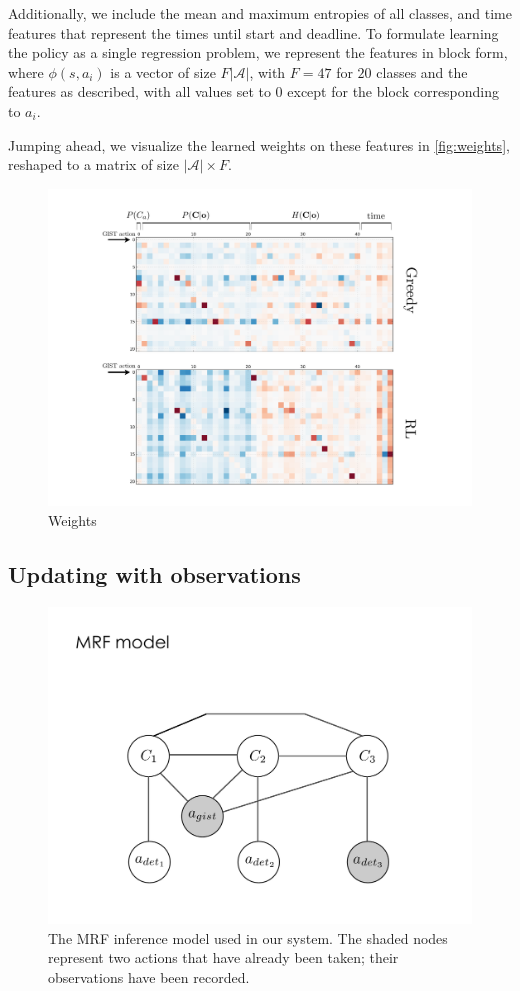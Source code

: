 Additionally, we include the mean and maximum entropies of all classes, and time features that represent the times until start and deadline.
To formulate learning the policy as a single regression problem, we represent the features in block form, where $\phi(s,a_i)$ is a vector of size $F|\mathcal{A}|$, with $F=47$ for $20$ classes and the features as described, with all values set to $0$ except for the block corresponding to $a_i$.

Jumping ahead, we visualize the learned weights on these features in \autoref{fig:weights}, reshaped to a matrix of size $|\mathcal{A}| \times F$.

\begin{figure}[h!]
\centering
\includegraphics[width=0.87\linewidth]
    {../figures/weights.pdf}
\caption{Weights }
\label{fig:weights}
\end{figure}

\subsection{Updating with observations}
\begin{figure}[h!]
\centering
\includegraphics[width=0.56\linewidth]{../figures/mrf_w_gist.pdf}
\caption{
The MRF inference model used in our system. The shaded nodes represent two actions that have already been taken; their observations have been recorded.
}
\label{fig:model}
\end{figure}

